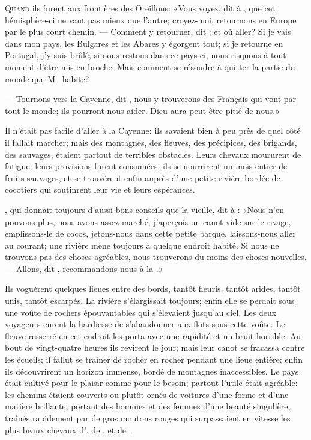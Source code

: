 \lettrine{Q}{uand} ils furent aux frontières des Oreillons: «Vous voyez, dit 
à , que cet hémisphère-ci ne vaut pas mieux que l’autre;
croyez-moi, retournons en Europe par le plus court chemin. — Comment y
retourner, dit ; et où aller? Si je vais dans mon pays, les
Bulgares et les Abares y égorgent tout; si je retourne en Portugal, j’y
suis brûlé; si nous restons dans ce pays-ci, nous risquons à tout
moment d’être mis en broche. Mais comment se résoudre à quitter la
partie du monde que M~ habite?

 — Tournons vers la Cayenne, dit , nous y trouverons des Français
qui vont par tout le monde; ils pourront nous aider. Dieu aura
peut-être pitié de nous.»

Il n’était pas facile d’aller à la Cayenne: ils savaient bien à peu
près de quel côté il fallait marcher; mais des montagnes, des fleuves,
des précipices, des brigands, des sauvages, étaient partout de
terribles obstacles. Leurs
chevaux
 moururent de fatigue; leurs
provisions furent consumées; ils se nourrirent un mois entier de fruits
sauvages, et se trouvèrent enfin auprès d’une petite rivière bordée de
cocotiers qui soutinrent leur vie et leurs espérances.

, qui donnait toujours d’aussi bons conseils que la vieille, dit
à : «Nous n’en pouvons plus, nous avons assez marché; j’aperçois
un canot vide sur le rivage, emplissons-le de cocos, jetons-nous dans
cette petite barque, laissons-nous aller au courant; une rivière mène
toujours à quelque endroit habité. Si nous ne trouvons pas des choses
agréables, nous trouverons du moins des choses nouvelles. — Allons, dit
, recommandons-nous à la .»


Ils voguèrent quelques lieues entre des bords, tantôt fleuris, tantôt
arides, tantôt unis, tantôt escarpés. La rivière s’élargissait
toujours; enfin elle se perdait sous une voûte de rochers épouvantables
qui s’élevaient jusqu’au ciel. Les deux voyageurs eurent la hardiesse
de  s’abandonner aux flots sous cette voûte. Le fleuve resserré en cet
endroit les porta avec une rapidité et un bruit horrible. Au bout de
vingt-quatre heures ils revirent le jour; mais leur canot se fracassa
contre les écueils; il fallut se traîner de rocher en rocher pendant
une lieue entière; enfin ils découvrirent un horizon immense, bordé de
montagnes inaccessibles. Le pays était cultivé pour le plaisir comme
pour le besoin; partout l’utile était agréable: les chemins étaient
couverts ou plutôt ornés de voitures d’une forme et d’une matière
brillante, portant des hommes et des femmes d’une beauté singulière,
traînés rapidement par de gros moutons rouges qui surpassaient en
vitesse les plus beaux chevaux d’, de , et de .




